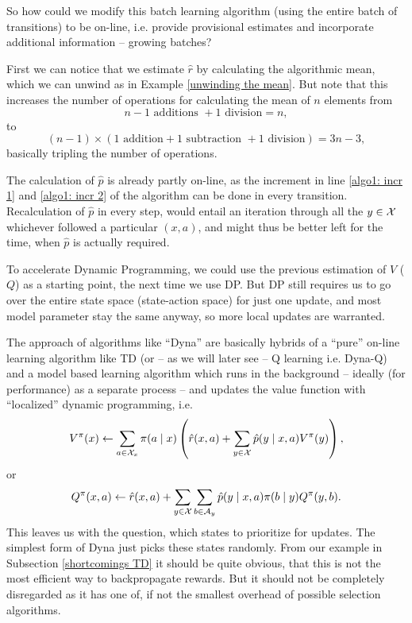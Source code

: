 So how could we modify this batch learning algorithm (using the entire batch of transitions) to be on-line, i.e. provide provisional estimates and incorporate additional information -- growing batches?

First we can notice that we estimate \(\hat{r}\) by calculating the algorithmic mean, which we can unwind as in Example \ref{unwinding the mean}. But note that this increases the number of operations for calculating the mean of \(n\) elements from 
\[
	n-1 \text{ additions } + 1\text{ division} = n,
\]
to 
\[
	(n-1) \times (1\text{ addition} + 1 \text{ subtraction } + 1\text{ division})=3n - 3,
\]
basically tripling the number of operations. 

The calculation of \(\hat{p}\) is already partly on-line, as the increment in line \ref{algo1: incr 1} and \ref{algo1: incr 2} of the algorithm can be done in every transition. Recalculation of \(\hat{p}\) in every step, would entail an iteration through all the \(y\in\mathcal{X}\) whichever followed a particular \((x,a)\), and might thus be better left for the time, when \(\hat{p}\) is actually required.

To accelerate Dynamic Programming, we could use the previous estimation of \(V\) (\(Q\)) as a starting point, the next time we use DP. But DP still requires us to go over the entire state space (state-action space) for just one update, and most model parameter stay the same anyway, so more local updates are warranted.

The approach of algorithms like ``Dyna'' are basically hybrids of a ``pure'' on-line learning algorithm like TD (or -- as we will later see -- Q learning i.e. Dyna-Q) and a model based learning algorithm which runs in the background -- ideally (for performance) as a separate process -- and updates the value function with ``localized'' dynamic programming, i.e.
\begin{align}
	\label{async DP V}
	V^\pi(x) \gets \sum_{a\in\mathcal{X}_x}\pi(a\mid x) \left( \hat{r}(x,a) + \sum_{y\in\mathcal{X}} \hat{p}(y\mid x,a) V^\pi(y)\right),
\end{align}
or
\begin{align}\label{async DP Q}
	Q^\pi(x,a) \gets \hat{r}(x,a) + \sum_{y\in\mathcal{X}}\sum_{b\in\mathcal{A}_y} \hat{p}(y\mid x,a) \pi(b\mid y) Q^\pi(y,b).
\end{align}
This leaves us with the question, which states to prioritize for updates. The simplest form of Dyna just picks these states randomly. From our example in Subsection \ref{shortcomings TD} it should be quite obvious, that this is not the most efficient way to backpropagate rewards. But it should not be completely disregarded as it has one of, if not the smallest overhead of possible selection algorithms. 

